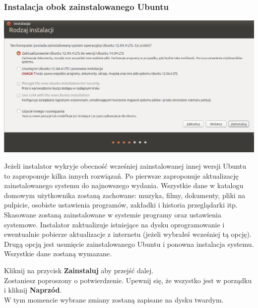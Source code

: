 \subsubsection{Instalacja obok zainstalowanego Ubuntu}
\begin{center}
        \includegraphics[scale=0.5]{images/instalator_partycjonowanie_obok_ubuntu.png}
\end{center}
Jeżeli instalator wykryje obecność wcześniej zainstalowanej innej wersji Ubuntu to zaproponuje kilka innych rozwiązań.
Po pierwsze zaproponuje aktualizację zainstalowanego systemu do najnowszego wydania. Wszystkie dane w katalogu domowym użytkownika zostaną zachowane: muzyka, filmy, dokumenty, pliki na pulpicie, osobiste ustawienia programów, zakładki i historia przeglądarki itp.
Skasowane zostaną zainstalowane w systemie programy oraz ustawienia systemowe. Instalator zaktualizuje istniejące na dysku oprogramowanie i ewentualnie pobierze aktualizacje z internetu (jeżeli wybrałeś wcześniej tą opcję).
Drugą opcją jest usunięcie zainstalowanego Ubuntu i ponowna instalacja systemu. Wszystkie dane zostaną wymazane.
\begin{flushright}
Kliknij na przycisk \textbf{Zainstaluj} aby przejść dalej.\\
Zostaniesz poproszony o potwierdzenie. Upewnij się, że wszystko jest w porządku i kliknij \textbf{Naprzód}.\\
W tym momencie wybrane zmiany zostaną zapisane na dysku twardym.
\end{flushright}
\clearpage
